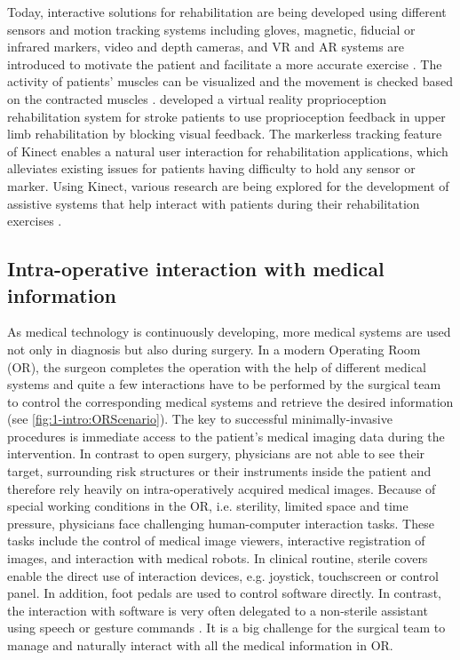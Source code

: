 Today, interactive solutions for rehabilitation are being developed using different sensors and motion tracking systems including gloves, magnetic, fiducial or infrared markers, video and depth cameras, and VR and AR systems are introduced to motivate the patient and facilitate a more accurate exercise \cite{DaGama2015,Cho2014}. 
The activity of patients' muscles can be visualized and the movement is checked based on the contracted muscles \cite{Woodford2007}. \citet{Cho2014} developed a virtual reality proprioception rehabilitation system for stroke patients to use proprioception feedback in upper limb rehabilitation by blocking visual feedback.
The markerless tracking feature of Kinect enables a natural user interaction for rehabilitation applications, which alleviates existing issues for patients having difficulty to hold any sensor or marker. Using Kinect, various research are being explored for the development of assistive systems that help interact with patients during their rehabilitation exercises \cite{Cordella2012, Gama2012a, Anton2013, Borghese2013}.

\subsection{Intra-operative interaction with medical information}
As medical technology is continuously developing, more medical systems are used not only in diagnosis but also during surgery. In a modern Operating Room (OR), the surgeon completes the operation with the help of different medical systems and quite a few interactions have to be performed by the surgical team to control the corresponding medical systems and retrieve the desired information (see \figurename{\ref{fig:1-intro:ORScenario}}).
The key to successful minimally-invasive procedures is immediate access to the patient's medical imaging data during the intervention. In contrast to open surgery, physicians are not able to see their target, surrounding risk structures or their instruments inside the patient and therefore rely heavily on intra-operatively acquired medical images. Because of special working conditions in the OR, i.e. sterility, limited space and time pressure, physicians face challenging human-computer interaction tasks. These tasks include the control of medical image viewers, interactive registration of images, and interaction with medical robots. In clinical routine, sterile covers enable the direct use of interaction devices, e.g. joystick, touchscreen or control panel. In addition, foot pedals are used to control software directly. In contrast, the interaction with software is very often delegated to a non-sterile assistant using speech or gesture commands \cite{Hubler2014}.
It is a big challenge for the surgical team to manage and naturally interact with all the medical information in OR.


